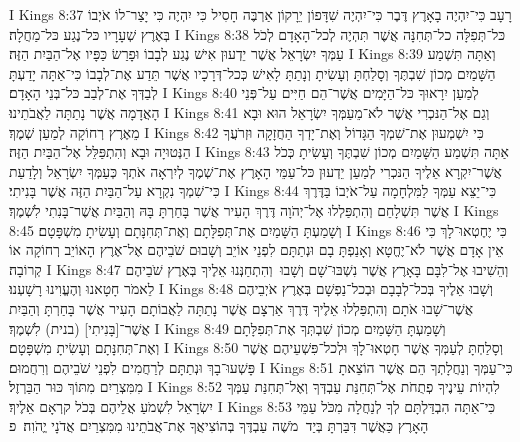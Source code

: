 I Kings 8:37	רָעָב כִּי־יִהְיֶה בָאָרֶץ דֶּבֶר כִּי־יִהְיֶה שִׁדָּפוֹן יֵרָקוֹן אַרְבֶּה חָסִיל כִּי יִהְיֶה כִּי יָצַר־לוֹ אֹיְבוֹ בְּאֶרֶץ שְׁעָרָיו כּל־נֶגַע כּל־מַחֲלָה׃
I Kings 8:38	כּל־תְּפִלָּה כל־תְּחִנָּה אֲשֶׁר תִּהְיֶה לְכל־הָאָדָם לְכֹל עַמְּךָ יִשְׂרָאֵל אֲשֶׁר יֵדְעוּן אִישׁ נֶגַע לְבָבוֹ וּפָרַשׂ כַּפָּיו אֶל־הַבַּיִת הַזֶּה׃
I Kings 8:39	וְאַתָּה תִּשְׁמַע הַשָּׁמַיִם מְכוֹן שִׁבְתֶּךָ וְסָלַחְתָּ וְעָשִׂיתָ וְנָתַתָּ לָאִישׁ כְּכל־דְּרָכָיו אֲשֶׁר תֵּדַע אֶת־לְבָבוֹ כִּי־אַתָּה יָדַעְתָּ לְבַדְּךָ אֶת־לְבַב כּל־בְּנֵי הָאָדָם׃
I Kings 8:40	לְמַעַן יִרָאוּךָ כּל־הַיָּמִים אֲשֶׁר־הֵם חַיִּים עַל־פְּנֵי הָאֲדָמָה אֲשֶׁר נָתַתָּה לַאֲבֹתֵינוּ׃
I Kings 8:41	וְגַם אֶל־הַנּכְרִי אֲשֶׁר לֹא־מֵעַמְּךָ יִשְׂרָאֵל הוּא וּבָא מֵאֶרֶץ רְחוֹקָה לְמַעַן שְׁמֶךָ׃
I Kings 8:42	כִּי יִשְׁמְעוּן אֶת־שִׁמְךָ הַגָּדוֹל וְאֶת־יָדְךָ הַחֲזָקָה וּזְרֹעֲךָ הַנְּטוּיָה וּבָא וְהִתְפַּלֵּל אֶל־הַבַּיִת הַזֶּה׃
I Kings 8:43	אַתָּה תִּשְׁמַע הַשָּׁמַיִם מְכוֹן שִׁבְתֶּךָ וְעָשִׂיתָ כְּכֹל אֲשֶׁר־יִקְרָא אֵלֶיךָ הַנּכְרִי לְמַעַן יֵדְעוּן כּל־עַמֵּי הָאָרֶץ אֶת־שְׁמֶךָ לְיִרְאָה אֹתְךָ כְּעַמְּךָ יִשְׂרָאֵל וְלָדַעַת כִּי־שִׁמְךָ נִקְרָא עַל־הַבַּיִת הַזֶּה אֲשֶׁר בָּנִיתִי׃
I Kings 8:44	כִּי־יֵצֵא עַמְּךָ לַמִּלְחָמָה עַל־אֹיְבוֹ בַּדֶּרֶךְ אֲשֶׁר תִּשְׁלָחֵם וְהִתְפַּלְלוּ אֶל־יְהֹוָה דֶּרֶךְ הָעִיר אֲשֶׁר בָּחַרְתָּ בָּהּ וְהַבַּיִת אֲשֶׁר־בָּנִתִי לִשְׁמֶךָ׃
I Kings 8:45	וְשָׁמַעְתָּ הַשָּׁמַיִם אֶת־תְּפִלָּתָם וְאֶת־תְּחִנָּתָם וְעָשִׂיתָ מִשְׁפָּטָם׃
I Kings 8:46	כִּי יֶחֶטְאוּ־לָךְ כִּי אֵין אָדָם אֲשֶׁר לֹא־יֶחֱטָא וְאָנַפְתָּ בָם וּנְתַתָּם לִפְנֵי אוֹיֵב וְשָׁבוּם שֹׁבֵיהֶם אֶל־אֶרֶץ הָאוֹיֵב רְחוֹקָה אוֹ קְרוֹבָה׃
I Kings 8:47	וְהֵשִׁיבוּ אֶל־לִבָּם בָּאָרֶץ אֲשֶׁר נִשְׁבּוּ־שָׁם וְשָׁבוּ  וְהִתְחַנְּנוּ אֵלֶיךָ בְּאֶרֶץ שֹׁבֵיהֶם לֵאמֹר חָטָאנוּ וְהֶעֱוִינוּ רָשָׁעְנוּ׃
I Kings 8:48	וְשָׁבוּ אֵלֶיךָ בְּכל־לְבָבָם וּבְכל־נַפְשָׁם בְּאֶרֶץ אֹיְבֵיהֶם אֲשֶׁר־שָׁבוּ אֹתָם וְהִתְפַּלְלוּ אֵלֶיךָ דֶּרֶךְ אַרְצָם אֲשֶׁר נָתַתָּה לַאֲבוֹתָם הָעִיר אֲשֶׁר בָּחַרְתָּ וְהַבַּיִת אֲשֶׁר־[בָּנִיתִי] (בנית) לִשְׁמֶךָ׃
I Kings 8:49	וְשָׁמַעְתָּ הַשָּׁמַיִם מְכוֹן שִׁבְתְּךָ אֶת־תְּפִלָּתָם וְאֶת־תְּחִנָּתָם וְעָשִׂיתָ מִשְׁפָּטָם׃
I Kings 8:50	וְסָלַחְתָּ לְעַמְּךָ אֲשֶׁר חָטְאוּ־לָךְ וּלְכל־פִּשְׁעֵיהֶם אֲשֶׁר פָּשְׁעוּ־בָךְ וּנְתַתָּם לְרַחֲמִים לִפְנֵי שֹׁבֵיהֶם וְרִחֲמוּם׃
I Kings 8:51	כִּי־עַמְּךָ וְנַחֲלָתְךָ הֵם אֲשֶׁר הוֹצֵאתָ מִמִּצְרַיִם מִתּוֹךְ כּוּר הַבַּרְזֶל׃
I Kings 8:52	לִהְיוֹת עֵינֶיךָ פְתֻחֹת אֶל־תְּחִנַּת עַבְדְּךָ וְאֶל־תְּחִנַּת עַמְּךָ יִשְׂרָאֵל לִשְׁמֹעַ אֲלֵיהֶם בְּכֹל קרְאָם אֵלֶיךָ׃
I Kings 8:53	כִּי־אַתָּה הִבְדַּלְתָּם לְךָ לְנַחֲלָה מִכֹּל עַמֵּי הָאָרֶץ כַּאֲשֶׁר דִּבַּרְתָּ בְּיַד  מֹשֶׁה עַבְדֶּךָ בְּהוֹצִיאֲךָ אֶת־אֲבֹתֵינוּ מִמִּצְרַיִם אֲדֹנָי יֱהֹוִה׃ {פ}
